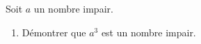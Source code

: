 \begin{exo}{}
	Soit $a$ un nombre impair.
	\begin{enumerate}
		\item Démontrer que $a^3$ est un nombre impair.
	\end{enumerate}
\end{exo}
